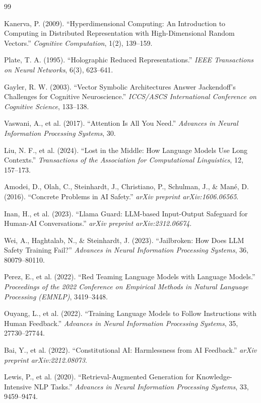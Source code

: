 \documentclass[a4paper,11pt]{article}
\begin{document}
\begin{thebibliography}{99}

Kanerva, P. (2009).
``Hyperdimensional Computing: An Introduction to Computing in Distributed Representation with High-Dimensional Random Vectors.''
\textit{Cognitive Computation}, 1(2), 139--159.

Plate, T. A. (1995).
``Holographic Reduced Representations.''
\textit{IEEE Transactions on Neural Networks}, 6(3), 623--641.

Gayler, R. W. (2003).
``Vector Symbolic Architectures Answer Jackendoff's Challenges for Cognitive Neuroscience.''
\textit{ICCS/ASCS International Conference on Cognitive Science}, 133--138.

Vaswani, A., et al. (2017).
``Attention Is All You Need.''
\textit{Advances in Neural Information Processing Systems}, 30.

Liu, N. F., et al. (2024).
``Lost in the Middle: How Language Models Use Long Contexts.''
\textit{Transactions of the Association for Computational Linguistics}, 12, 157--173.

Amodei, D., Olah, C., Steinhardt, J., Christiano, P., Schulman, J., \& Man\'{e}, D. (2016).
``Concrete Problems in AI Safety.''
\textit{arXiv preprint arXiv:1606.06565}.

Inan, H., et al. (2023).
``Llama Guard: LLM-based Input-Output Safeguard for Human-AI Conversations.''
\textit{arXiv preprint arXiv:2312.06674}.

Wei, A., Haghtalab, N., \& Steinhardt, J. (2023).
``Jailbroken: How Does LLM Safety Training Fail?''
\textit{Advances in Neural Information Processing Systems}, 36, 80079--80110.

Perez, E., et al. (2022).
``Red Teaming Language Models with Language Models.''
\textit{Proceedings of the 2022 Conference on Empirical Methods in Natural Language Processing (EMNLP)}, 3419--3448.

Ouyang, L., et al. (2022).
``Training Language Models to Follow Instructions with Human Feedback.''
\textit{Advances in Neural Information Processing Systems}, 35, 27730--27744.

Bai, Y., et al. (2022).
``Constitutional AI: Harmlessness from AI Feedback.''
\textit{arXiv preprint arXiv:2212.08073}.

Lewis, P., et al. (2020).
``Retrieval-Augmented Generation for Knowledge-Intensive NLP Tasks.''
\textit{Advances in Neural Information Processing Systems}, 33, 9459--9474.


\end{thebibliography}
\end{document}
